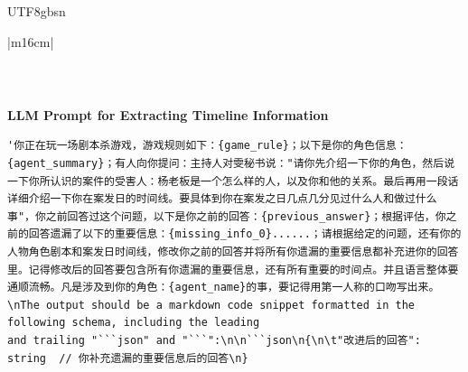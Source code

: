 \documentclass[11pt]{article}
\begin{document}
{\begin{CJK}{UTF8}{gbsn}
\begin{table}[ht!]
\begin{minipage}{\textwidth}
\begin{tabular}{|m{16cm}|}
\begin{minipage}[t]{\linewidth}
\begin{verbatim}
\end{verbatim}
\end{minipage} \\
\hline



\hline
{}  {\textbf{LLM Prompt for Extracting Timeline Information}} \\
\begin{minipage}[t]{\linewidth}
\small\begin{verbatim}
'你正在玩一场剧本杀游戏，游戏规则如下：{game_rule}；以下是你的角色信息：{agent_summary}；有人向你提问：主持人对雯秘书说："请你先介绍一下你的角色，然后说一下你所认识的案件的受害人：杨老板是一个怎么样的人，以及你和他的关系。最后再用一段话详细介绍一下你在案发日的时间线。要具体到你在案发之日几点几分见过什么人和做过什么事"，你之前回答过这个问题，以下是你之前的回答：{previous_answer}；根据评估，你之前的回答遗漏了以下的重要信息：{missing_info_0}......；请根据给定的问题，还有你的人物角色剧本和案发日时间线，修改你之前的回答并将所有你遗漏的重要信息都补充进你的回答里。记得修改后的回答要包含所有你遗漏的重要信息，还有所有重要的时间点。并且语言整体要通顺流畅。凡是涉及到你的角色：{agent_name}的事，要记得用第一人称的口吻写出来。\nThe output should be a markdown code snippet formatted in the following schema, including the leading 
and trailing "```json" and "```":\n\n```json\n{\n\t"改进后的回答": string  // 你补充遗漏的重要信息后的回答\n}


\end{verbatim}
\end{minipage}
\end{tabular}
\end{minipage}
\end{table}
\end{CJK}}
\end{document}
